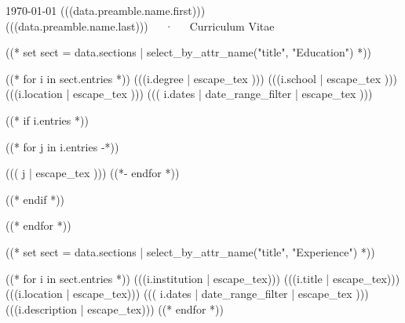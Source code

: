 \documentclass[10pt, letterpaper]{awesome-cv}
\begin{document}
\makecvheader

\makecvfooter
  {\today}
  {(((data.preamble.name.first))) (((data.preamble.name.last)))~~~·~~~Curriculum Vitae}
  {\thepage}



((* set sect = data.sections | select_by_attr_name("title", "Education") *))
\begin{cventries}
((* for i in sect.entries *))
\cventry
  {(((i.degree | escape_tex )))}
  {(((i.school | escape_tex )))}
  {(((i.location | escape_tex )))}
  {((( i.dates | date_range_filter | escape_tex )))}
  {((* if i.entries *))
    \begin{cvitems}
    ((* for j in i.entries -*))
    \item ((( j | escape_tex )))
    ((*- endfor *))
    \end{cvitems}
    ((* endif *))}
((* endfor *))
\end{cventries}

((* set sect = data.sections | select_by_attr_name("title", "Experience") *))
\begin{cventries}
((* for i in sect.entries *))
\cventry
  {(((i.institution | escape_tex)))}
  {(((i.title | escape_tex)))}
  {(((i.location | escape_tex)))}
  {((( i.dates | date_range_filter | escape_tex )))}
  {(((i.description | escape_tex)))}
((* endfor *))
\end{cventries}
\end{document}

